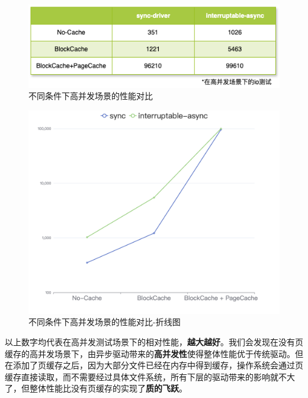 \documentclass{article}
\begin{document}
\begin{figure}[H]
    \centering
    \includegraphics[width=1.0\linewidth]{assets//fs/perf.png}
    \caption{不同条件下高并发场景的性能对比}
\end{figure}

\begin{figure}[H]
    \centering
    \includegraphics[width=0.7\linewidth]{assets//fs/perf-line.png}
    \caption{不同条件下高并发场景的性能对比-折线图}
\end{figure}

以上数字均代表在高并发测试场景下的相对性能，\textbf{越大越好}。我们会发现在没有页缓存的高并发场景下，由异步驱动带来的\textbf{高并发性}使得整体性能优于传统驱动。但在添加了页缓存之后，因为大部分文件已经在内存中得到缓存，操作系统会通过页缓存直接读取，而不需要经过具体文件系统，所有下层的驱动带来的影响就不大了，但整体性能比没有页缓存的实现了\textbf{质的飞跃}。
\end{document}
